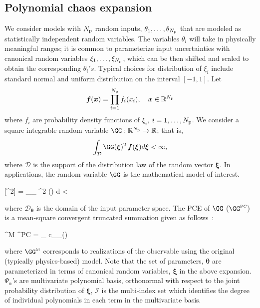 \subsection{Polynomial chaos expansion}

We consider models with ${N_\text{p}}$ random inputs, 
$\theta_1, \ldots, \theta_{N_\text{p}}$ that are modeled
as statistically independent random variables. The 
variables $\theta_i$ will take in physically meaningful
ranges; it is common to parameterize input uncertainties
with canonical random variables $\xi_1, \ldots, \xi_{N_\text{p}}$,
which can be then shifted and scaled to obtain the corresponding $\theta_i's$.
Typical choices for distribution of $\xi_i$ include standard normal 
and uniform distribution on the interval $[-1, 1]$.
Let 
\[
   \bm{f}(\bm{x}) = \prod_{i=1}^{N_\text{p}} f_i(x_i), \quad \bm{x} \in \mathbb{R}^{N_\text{p}}
\]
where $f_i$ are probability density functions of $\xi_i$, $i = 1, \ldots, {N_\text{p}}$.
We consider a square integrable random variable $\GG:\R^\Np \to \R$; 
that is,
\[
\int_{\mathcal{D}} \GG(\bm{\xi})^2 \, \bm{f}(\bm{\xi})d\bm{\xi} < \infty,
\]
where $\mathcal{D}$ is the support of the distribution law of the random vector
$\bm{\xi}$. In applications, 
the random variable $\GG$ is the mathematical model of interest. 


\be
{}[\GG^2] = \int_{_{\bm{\theta}}} \GG^2 (\bm{\theta}) 
d\bm{\theta} < \infty
\ee

\noindent where $\mathcal{D}_{\bm{\theta}}$ is the domain of the input parameter space. The PCE of
$\GG$ ($\GG^{\mbox{\tiny {PC}}}$) is a mean-square 
convergent truncated summation given as
follows~\cite{Xiu:2002,Ghanem:2003,Olivier:2010}:

\be
\GG^{\mbox{\tiny M}} \approx \GG^{\mbox{\tiny PC}} = 
\sum_{\alpha\in{}} c_{\alpha}\Psi_{\alpha}(\bm{\xi(\theta)}) 
\ee

\noindent where $\GG^{\mbox{\tiny M}}$ corresponds to realizations of the
observable using the original (typically physics-based) model. 
Note that the set of parameters, $\bm{\theta}$ are parameterized in terms of canonical random
variables, $\bm{\xi}$ in the above expansion. $\Psi_{\alpha}$'s are multivariate polynomial
basis, orthonormal with respect to the joint probability distribution of $\bm{\xi}$, $\mathcal{I}$
is the multi-index set which identifies the degree of individual polynomials in each term in the
multivariate basis.

